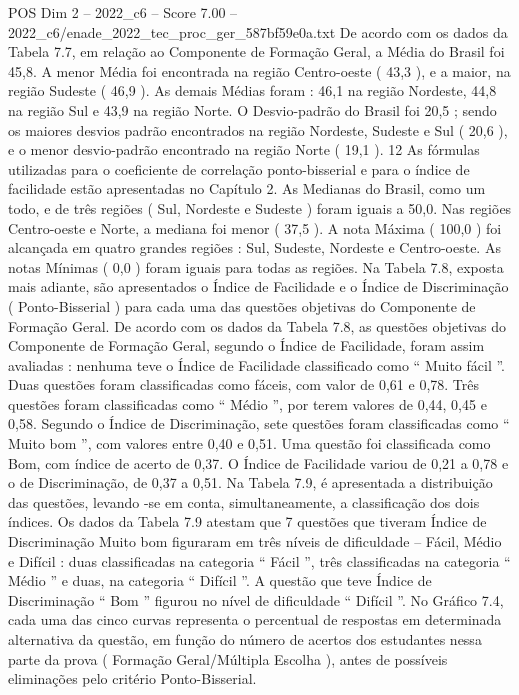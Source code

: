 \begin{textsample}{POS Dim 2 – 2022\_c6 – Score 7.00 – 2022\_c6/enade\_2022\_tec\_proc\_ger\_587bf59e0a.txt}
De acordo com os dados da Tabela 7.7, em relação ao Componente de Formação Geral, a Média do Brasil foi 45,8.
A menor Média foi encontrada na região Centro-oeste ( 43,3 ), e a maior, na região Sudeste ( 46,9 ).
As demais Médias foram : 46,1 na região Nordeste, 44,8 na região Sul e 43,9 na região Norte.
O Desvio-padrão do Brasil foi 20,5 ; sendo os maiores desvios padrão encontrados na região Nordeste, Sudeste e Sul ( 20,6 ), e o menor desvio-padrão encontrado na região Norte ( 19,1 ). 12 As fórmulas utilizadas para o coeficiente de correlação ponto-bisserial e para o índice de facilidade estão apresentadas no Capítulo 2.
As Medianas do Brasil, como um todo, e de três regiões ( Sul, Nordeste e Sudeste ) foram iguais a 50,0.
Nas regiões Centro-oeste e Norte, a mediana foi menor ( 37,5 ).
A nota Máxima ( 100,0 ) foi alcançada em quatro grandes regiões : Sul, Sudeste, Nordeste e Centro-oeste.
As notas Mínimas ( 0,0 ) foram iguais para todas as regiões.
Na Tabela 7.8, exposta mais adiante, são apresentados o Índice de Facilidade e o Índice de Discriminação ( Ponto-Bisserial ) para cada uma das questões objetivas do Componente de Formação Geral.
De acordo com os dados da Tabela 7.8, as questões objetivas do Componente de Formação Geral, segundo o Índice de Facilidade, foram assim avaliadas : nenhuma teve o Índice de Facilidade classificado como “ Muito fácil ”.
Duas questões foram classificadas como fáceis, com valor de 0,61 e 0,78.
Três questões foram classificadas como “ Médio ”, por terem valores de 0,44, 0,45 e 0,58.
Segundo o Índice de Discriminação, sete questões foram classificadas como “ Muito bom ”, com valores entre 0,40 e 0,51.
Uma questão foi classificada como Bom, com índice de acerto de 0,37.
O Índice de Facilidade variou de 0,21 a 0,78 e o de Discriminação, de 0,37 a 0,51.
Na Tabela 7.9, é apresentada a distribuição das questões, levando -se em conta, simultaneamente, a classificação dos dois índices.
Os dados da Tabela 7.9 atestam que 7 questões que tiveram Índice de Discriminação Muito bom figuraram em três níveis de dificuldade – Fácil, Médio e Difícil : duas classificadas na categoria “ Fácil ”, três classificadas na categoria “ Médio ” e duas, na categoria “ Difícil ”.
A questão que teve Índice de Discriminação “ Bom ” figurou no nível de dificuldade “ Difícil ”.
No Gráfico 7.4, cada uma das cinco curvas representa o percentual de respostas em determinada alternativa da questão, em função do número de acertos dos estudantes nessa parte da prova ( Formação Geral/Múltipla Escolha ), antes de possíveis eliminações pelo critério Ponto-Bisserial.

\end{textsample}
